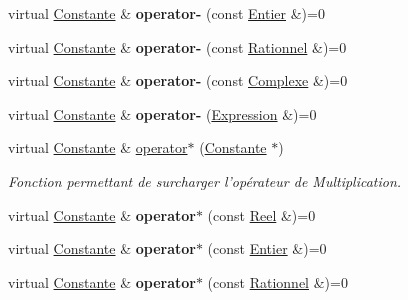 \begin{DoxyCompactItemize}
\item 
\hypertarget{class_constante_a0227e180269d318299bf7981a639d196}{virtual \hyperlink{class_constante}{Constante} \& {\bfseries operator-\/} (const \hyperlink{class_entier}{Entier} \&)=0}\label{class_constante_a0227e180269d318299bf7981a639d196}

\item 
\hypertarget{class_constante_aa525b610edbed58856836181b8ea78f8}{virtual \hyperlink{class_constante}{Constante} \& {\bfseries operator-\/} (const \hyperlink{class_rationnel}{Rationnel} \&)=0}\label{class_constante_aa525b610edbed58856836181b8ea78f8}

\item 
\hypertarget{class_constante_aa8f176be374c96fbe1c24716eabf9b07}{virtual \hyperlink{class_constante}{Constante} \& {\bfseries operator-\/} (const \hyperlink{class_complexe}{Complexe} \&)=0}\label{class_constante_aa8f176be374c96fbe1c24716eabf9b07}

\item 
\hypertarget{class_constante_aca98518ee0933a3eabe01da0739e36be}{virtual \hyperlink{class_constante}{Constante} \& {\bfseries operator-\/} (\hyperlink{class_expression}{Expression} \&)=0}\label{class_constante_aca98518ee0933a3eabe01da0739e36be}

\item 
virtual \hyperlink{class_constante}{Constante} \& \hyperlink{class_constante_a4293c8632cc246b0e88285ae4afd2128}{operator$\ast$} (\hyperlink{class_constante}{Constante} $\ast$)
\begin{DoxyCompactList}\small\item\em Fonction permettant de surcharger l'opérateur de Multiplication. \end{DoxyCompactList}\item 
\hypertarget{class_constante_a44b5993c7da0b9e89a40980f2bcb8f1e}{virtual \hyperlink{class_constante}{Constante} \& {\bfseries operator$\ast$} (const \hyperlink{class_reel}{Reel} \&)=0}\label{class_constante_a44b5993c7da0b9e89a40980f2bcb8f1e}

\item 
\hypertarget{class_constante_aeabf86524c5dca456de99068eff0faa0}{virtual \hyperlink{class_constante}{Constante} \& {\bfseries operator$\ast$} (const \hyperlink{class_entier}{Entier} \&)=0}\label{class_constante_aeabf86524c5dca456de99068eff0faa0}

\item 
\hypertarget{class_constante_a4b7d7328c364c30e53c5045eea6fe58c}{virtual \hyperlink{class_constante}{Constante} \& {\bfseries operator$\ast$} (const \hyperlink{class_rationnel}{Rationnel} \&)=0}\label{class_constante_a4b7d7328c364c30e53c5045eea6fe58c}


\end{DoxyCompactItemize}
